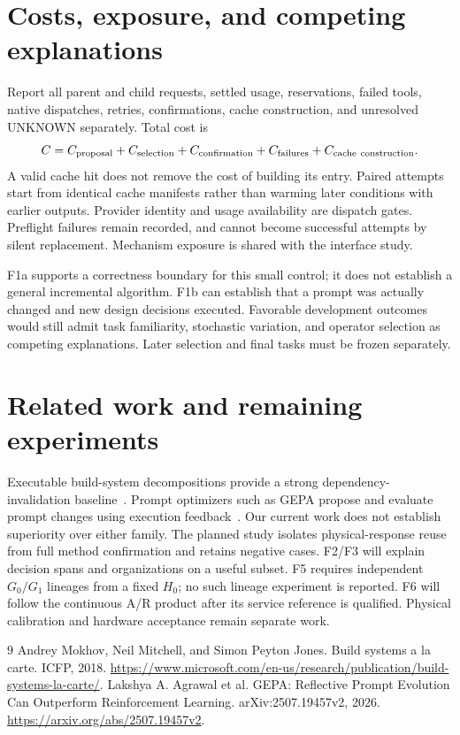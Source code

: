\documentclass[10pt]{article}
\begin{document}


\section{Costs, exposure, and competing explanations}
Report all parent and child requests, settled usage, reservations, failed tools,
native dispatches, retries, confirmations, cache construction, and unresolved
UNKNOWN separately. Total cost is
\[
C=C_{\rm proposal}+C_{\rm selection}+C_{\rm confirmation}
  +C_{\rm failures}+C_{\rm cache\ construction}.
\]
A valid cache hit does not remove the cost of building its entry. Paired attempts
start from identical cache manifests rather than warming later conditions with
earlier outputs. Provider identity and usage availability are dispatch gates.
Preflight failures remain recorded, and cannot become successful attempts by
silent replacement. Mechanism exposure is shared with the interface study.

F1a supports a correctness boundary for this small control; it does not establish
a general incremental algorithm. F1b can establish that a prompt was actually
changed and new design decisions executed. Favorable development outcomes would
still admit task familiarity, stochastic variation, and operator selection as
competing explanations. Later selection and final tasks must be frozen separately.

\section{Related work and remaining experiments}
Executable build-system decompositions provide a strong dependency-invalidation
baseline~\cite{mokhov2018}. Prompt optimizers such as GEPA propose and evaluate
prompt changes using execution feedback~\cite{agrawal2026gepa}. Our current work
does not establish superiority over either family. The planned study isolates
physical-response reuse from full method confirmation and retains negative cases.
F2/F3 will explain decision spans and organizations on a useful subset. F5 requires
independent $G_0/G_1$ lineages from a fixed $H_0$; no such lineage experiment is
reported. F6 will follow the continuous A/R product after its service reference is
qualified. Physical calibration and hardware acceptance remain separate work.

\begin{thebibliography}{9}
 Andrey Mokhov, Neil Mitchell, and Simon Peyton Jones.
Build systems a la carte. ICFP, 2018.
\url{https://www.microsoft.com/en-us/research/publication/build-systems-la-carte/}.
 Lakshya A. Agrawal et al.
GEPA: Reflective Prompt Evolution Can Outperform Reinforcement Learning.
arXiv:2507.19457v2, 2026.
\url{https://arxiv.org/abs/2507.19457v2}.
\end{thebibliography}
\end{document}
